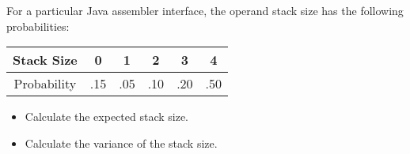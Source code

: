 ﻿\documentclass[a4]{beamer}
\begin{document}
\begin{frame}
For a particular Java assembler interface, the operand stack size has the
following probabilities:
\begin{tabular}{|c||c|c|c|c|c|}
  \hline
  Stack Size  & 0 & 1 & 2 & 3 & 4 \\ \hline
 Probability & .15 & .05 & .10 &.20 &.50\\
  \hline
\end{tabular}
\begin{itemize}
\item Calculate the expected stack size.
\item Calculate the variance of the stack size.
\end{itemize}
\end{frame}
\end{document}
